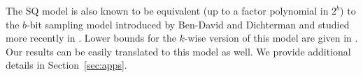 The SQ model is also known to be equivalent (up to a factor polynomial in $2^b$) to the $b$-bit sampling model introduced by Ben-David and Dichterman \cite{Ben-DavidD98} and studied more recently in \cite{FeldmanGRVX:12,FeldmanPV:13,ZhangDJW13,SteinhardtD15,SteinhardtVW16}. Lower bounds for the $k$-wise version of this model are given in \cite{ZhangDJW13,SteinhardtVW16}.
Our results can be easily translated to this model as well. We provide additional details in Section~\ref{sec:apps}.
